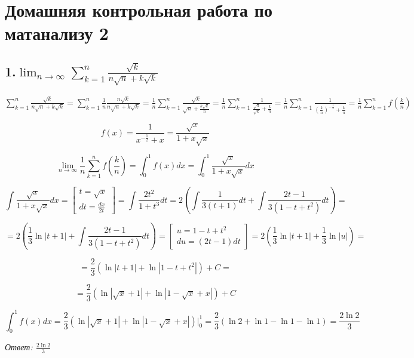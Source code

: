 \documentclass[a4paper]{article}
\author{Васильев Павел}
\begin{document}
\section*{Домашняя контрольная работа по матанализу 2}

\subsection*{1.$\displaystyle \lim_{n \rightarrow \infty} \sum_{k=1}^n \frac{\sqrt{k}}{n \sqrt{n} + k \sqrt{k}}$}

$\displaystyle \sum_{k=1}^n \frac{\sqrt{k}}{n \sqrt{n} + k \sqrt{k}} = \sum_{k=1}^n  \frac{1}{n} \frac{n \sqrt{k}}{n \sqrt{n} + k \sqrt{k}} = \frac{1}{n} \sum_{k=1}^n  \frac{\sqrt{k}}{\sqrt{n} + \frac{k \sqrt{k}}{n}} = \frac{1}{n}  \sum_{k=1}^n \frac{1}{\frac{\sqrt{n}}{\sqrt{k}} + \frac{k}{n}} = \frac{1}{n} \sum_{k=1}^n \frac{1}{ \left( \frac{k}{n} \right)^{-\frac{1}{2}} + \frac{k}{n}} = \frac{1}{n} \sum_{k=1}^n f \left( \frac{k}{n} \right)$

\[ \displaystyle f(x) = \frac{1}{x^{-\frac{1}{2}} + x} = \frac{ \sqrt{x} }{1 + x \sqrt{x}}
\]

\[
\displaystyle \lim_{n \rightarrow \infty} \frac{1}{n} \sum_{k=1}^n f \left(\frac{k}{n} \right) = \int_0^1 f(x) dx = \int_0^1 \frac{ \sqrt{x} }{1 + x \sqrt{x}} dx
\]

\[
\int \frac{ \sqrt{x} }{1 + x \sqrt{x}} dx = \begin{bmatrix}
t = \sqrt{x} \\
 dt = \frac{dx}{2t}
\end{bmatrix}
= \int \frac{2t^2}{1+t^3} dt = 2 \left( \int \frac{1}{3(t+1)} dt + \int \frac{2t-1}{3(1-t+t^2)} dt \right) =
\]

\[
= 2 \left( \frac{1}{3} \ln |t+1| +\int \frac{2t-1}{3(1-t+t^2)} dt \right) = \begin{bmatrix}
u = 1-t+t^2 \\ du = (2t-1)dt
\end{bmatrix} = 2 \left( \frac{1}{3} \ln |t+1| + \frac{1}{3} \ln|u| \right) =
\]

\[
= \frac{2}{3} \left(\ln |t+1| + \ln|1-t+t^2| \right) + C = 
\]

\[
= \frac{2}{3} \left( \ln |\sqrt{x}+1| + \ln|1-\sqrt{x}+x| \right) + C
\]

\[
\int_0^1 f(x)dx = \frac{2}{3} \left( \ln |\sqrt{x}+1| + \ln|1-\sqrt{x}+x| \right) \bigg|_0^1 = \frac{2}{3} \left( \ln 2 + \ln 1 - \ln 1 - \ln 1 \right) = \frac{2 \ln 2}{3}
\]

\textit{Ответ: $\frac{2 \ln 2}{3}$}
\end{document}

